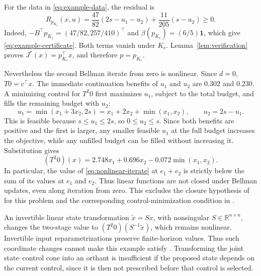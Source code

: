 \documentclass[10pt]{article}
\newcommand{\R}{\mathbb R}
\newcommand{\one}{\mathbf 1}
\begin{document}
For the data in \eqref{eq:example-data}, the residual is
\begin{equation}
 R_{p_{K_c}}(x,u)
 =\frac{47}{82}(2s-u_1-u_2)+\frac{11}{205}(s-u_2)\ge0.
 \label{eq:example-certificate}
\end{equation}
Indeed, $-B^\top p_{K_c}=(47/82,257/410)^\top$ and $\beta(p_{K_c})=(6/5)\one$, which give \eqref{eq:example-certificate}. Both terms vanish under $K_c$. Lemma~\ref{lem:verification} proves $J^*(x)=p_{K_c}^\top x$, and therefore $p=p_{K_c}$.

Nevertheless the second Bellman iterate from zero is nonlinear. Since $d=0$, $T0=c^\top x$. The immediate continuation benefits of $u_1$ and $u_2$ are $0.302$ and $0.230$. A minimizing control for $T^2 0$ first maximizes $u_1$, subject to the total budget, and fills the remaining budget with $u_2$:
\[
 u_1=\min(x_1+3x_2,2s)=x_1+2x_2+\min(x_1,x_2),\qquad
 u_2=2s-u_1.
\]
This is feasible because $s\le u_1\le2s$, so $0\le u_2\le s$. Since both benefits are positive and the first is larger, any smaller feasible $u_1$ at the full budget increases the objective, while any unfilled budget can be filled without increasing it. Substitution gives
\begin{equation}
 (T^2 0)(x)=2.748x_1+0.696x_2-0.072\min(x_1,x_2).
 \label{eq:nonlinear-iterate}
\end{equation}
In particular, the value of \eqref{eq:nonlinear-iterate} at $e_1+e_2$ is strictly below the sum of its values at $e_1$ and $e_2$. Thus linear functions are not closed under Bellman updates, even along iteration from zero. This excludes the closure hypothesis of \cite[Assumption~2.1(a)]{li-bertsekas} for this problem and the corresponding control-minimization condition in \cite{pates-rantzer}.

An invertible linear state transformation $\widetilde x=Sx$, with nonsingular $S\in\R^{n\times n}$, changes the two-stage value to $(T^2 0)(S^{-1}\widetilde x)$, which remains nonlinear. Invertible input reparametrizations preserve finite-horizon values. Thus such coordinate changes cannot make this example satisfy \cite[Theorem~1]{pates-rantzer}. Transforming the joint state--control cone into an orthant is insufficient if the proposed state depends on the current control, since it is then not prescribed before that control is selected.
\end{document}
